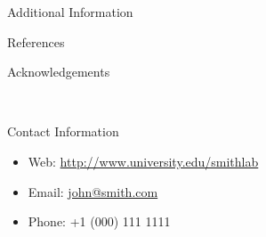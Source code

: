 \documentclass[final]{beamer}
\newlength{\onecolwid}
\begin{document}
\begin{frame}[t]
\begin{columns}[t]
\begin{column}{\onecolwid}
\begin{block}{Additional Information}
\end{block}


\begin{block}{References}

\nocite{*} %
\small{
\vspace{0.75in}}

\end{block}



\begin{block}{Acknowledgements}

\small{} \\

\end{block}



\begin{alertblock}{Contact Information}

\begin{itemize}
\item Web: \href{http://www.university.edu/smithlab}{http://www.university.edu/smithlab}
\item Email: \href{mailto:john@smith.com}{john@smith.com}
\item Phone: +1 (000) 111 1111
\end{itemize}

\end{alertblock}



\end{column} %
\end{columns} %
\end{frame} %
\end{document}
